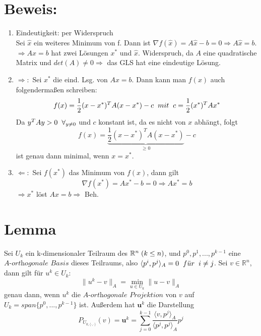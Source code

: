\documentclass{article}
\begin{document}
\section{Beweis:}
\begin{enumerate}
\item Eindeutigkeit: per Widerspruch
\\Sei $\hat x$ ein weiteres Minimum von f. Dann ist $\nabla f(\hat x) = A\hat x - b = 0 \Rightarrow A\hat x = b$.
\\$\Rightarrow Ax = b$ hat zwei Lösungen $x^{*}$ und $\hat x$. Widerspruch, da $A$ eine quadratische Matrix und $det(A) \ne 0 \Rightarrow $ das GLS hat eine eindeutige Lösung.
\item $\Rightarrow:$ Sei $x^{*}$ die eind. Lsg. von $Ax = b$. Dann kann man $f(x)$ auch folgenderma{\ss}en schreiben:
$$f(x) = \frac 1 2 (x - x^{*})^{T}A(x - x^{*}) - c \hspace{2mm} mit \hspace{2mm} c = \frac 1 2 (x^{*})^{T}Ax^{*}$$
Da $y^{T}Ay > 0 \hspace{2mm} \forall _{y \ne 0}$ und $c$ konstant ist, da es nicht von $x$ abhängt, folgt
$$f(x) = \underbrace {\frac 1 2 (x - x^{*})^{T}A(x - x^{*})}_{\ge 0} - c$$
ist genau dann minimal, wenn $x = x^{*}$.
\item $\Leftarrow:$ Sei $f(x^{*})$ das Minimum von $f(x)$, dann gilt
$$\nabla f(x^{*}) = Ax^{*} - b = 0 \Rightarrow Ax^{*} = b$$
$\Rightarrow x^{*}$ löst $Ax = b \Rightarrow$ Beh.
\end{enumerate}

\section{Lemma}
Sei $U_{k}$ ein k-dimensionaler Teilraum des $\mathbb{R}^{n} \hspace{1mm} (k \le n)$, und $p^{0}, p^{1},...,p^{k-1}$ eine $\textit{A-orthogonale Basis}$ dieses Teilraums, also $\langle p^{i}, p^{j} \rangle _{A} = 0 \hspace{2mm} f\ddot{u}r \hspace{2mm} i \ne j$. Sei $v \in \mathbb{R}^{n}$, dann gilt für $u^{k} \in U_{k}$:
\begin{equation}
\|u^{k} - v\|_{A} = \underset{u \in U_{k}}{\min} \|u - v\|_{A}
\end{equation}
genau dann, wenn $u^{k}$ die $\textit{A-orthogonale Projektion}$ von $v$ auf $U_{k} = span\{p^{0},...,p^{k-1}\}$ ist. Außerdem hat $\textbf{u}^{k}$ die Darstellung
\begin{equation}
P_{U_{k,\langle \cdot,\cdot \rangle}}(v) = \textbf{u}^{k} = \sum_{j=0}^{k-1} \frac {\langle v, p^{j} \rangle _{A}} {\langle p^{j}, p^{j} \rangle _{A}} p^{j}
\end{equation}
\end{document}
